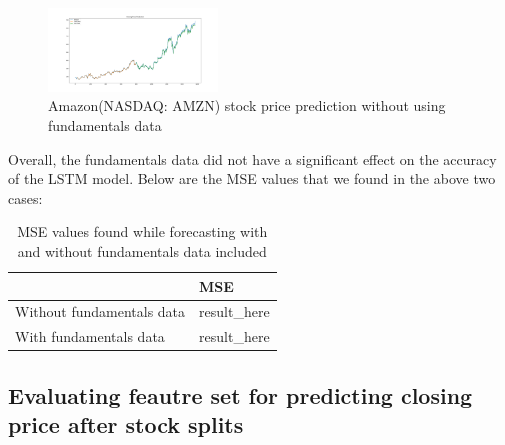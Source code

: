 \documentclass{article}
\begin{document}
\begin{figure}[h]
\centering
\includegraphics[width=0.4\textwidth]{amazon_without_fundamentals}
\caption{Amazon(NASDAQ: AMZN) stock price prediction without using fundamentals data}
\label{fig:amazon_without_funda}
\end{figure}

Overall, the fundamentals data did not have a significant effect on the accuracy of the LSTM model. Below are the MSE values that we found in the above two cases:
\begin{table}[H]
\centering
\label{evaluation_mse_amazon}
\begin{tabular}{|l|l|}
\hline
                          & MSE          \\ \hline
Without fundamentals data & result\_here \\ \hline
With fundamentals data    & result\_here \\ \hline
\end{tabular}
\caption{MSE values found while forecasting with and without fundamentals data included}
\end{table}
 
\subsection{Evaluating feautre set for predicting closing price after stock splits}
\label{sssec:predicting_stock_splits}
\end{document}
